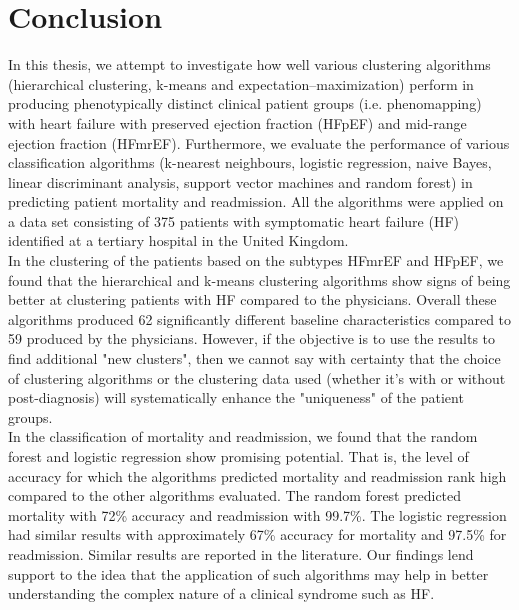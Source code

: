 \documentclass[../thesis.tex]{subfiles}
\begin{document}
\chapter{Conclusion}
\label{chap:conc}

\noindent In this thesis, we attempt to investigate how well various clustering algorithms (hierarchical clustering, k-means and expectation–maximization) perform in producing phenotypically distinct clinical patient groups (i.e. phenomapping) with heart failure with preserved ejection fraction (HFpEF) and mid-range ejection fraction (HFmrEF). Furthermore, we evaluate the performance of various classification algorithms (k-nearest neighbours, logistic regression, naive Bayes, linear discriminant analysis, support vector machines and random forest) in predicting patient mortality and readmission. All the algorithms were applied on a data set consisting of 375 patients with symptomatic heart failure (HF) identified at a tertiary hospital in the United Kingdom.\\
\indent In the clustering of the patients based on the subtypes HFmrEF and HFpEF, we found that the hierarchical and k-means clustering algorithms show signs of being better at clustering patients with HF compared to the physicians. Overall these algorithms produced 62 significantly different baseline characteristics compared to 59 produced by the physicians. However, if the objective is to use the results to find additional "new clusters", then we cannot say with certainty that the choice of clustering algorithms or the clustering data used (whether it's with or without post-diagnosis) will systematically enhance the "uniqueness" of the patient groups.\\
\indent In the classification of mortality and readmission, we found that the random forest and logistic regression show promising potential. That is, the level of accuracy for which the algorithms predicted mortality and readmission rank high compared to the other algorithms evaluated. The random forest predicted mortality with 72\% accuracy and readmission with 99.7\%. The logistic regression had similar results with approximately 67\% accuracy for mortality and 97.5\% for readmission. Similar results are reported in the literature. Our findings lend support to the idea that the application of such algorithms may help in better understanding the complex nature of a clinical syndrome such as HF.
\end{document}
